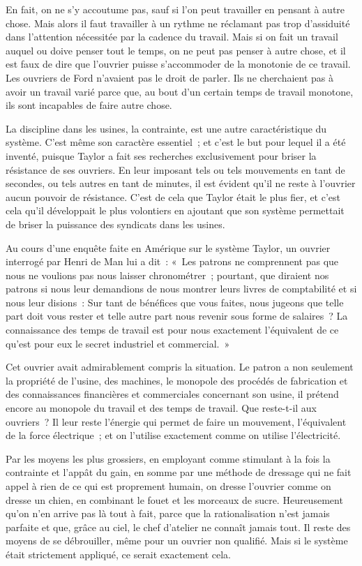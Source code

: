 \documentclass[french,twoside]{book} %
\begin{document}
En fait, on ne s'y accoutume pas, sauf si l'on peut travailler en pensant à autre chose. Mais alors il faut travailler à un rythme ne réclamant pas trop d'assiduité dans l'attention nécessitée par la cadence du travail. Mais si on fait un travail auquel ou doive penser tout le temps, on ne peut pas penser à autre chose, et il est faux de dire que l'ouvrier puisse s'accommoder de la monotonie de ce travail. Les ouvriers de Ford n'avaient pas le droit de parler. Ils ne cherchaient pas à avoir un travail varié parce que, au bout d'un certain temps de travail monotone, ils sont incapables de faire autre chose.\par
La discipline dans les usines, la contrainte, est une autre caractéristique du système. C'est même son caractère essentiel ; et c'est le but pour lequel il a été inventé, puisque Taylor a fait ses recherches exclusivement pour briser la résistance de ses ouvriers. En leur imposant tels ou tels mouvements en tant de secondes, ou tels autres en tant de minutes, il est évident qu'il ne reste à l'ouvrier aucun pouvoir de résistance. C'est de cela que Taylor était le plus fier, et c'est cela qu'il développait le plus volontiers en ajoutant que son système permettait de briser la puissance des syndicats dans les usines.\par
Au cours d'une enquête faite en Amérique sur le système Taylor, un ouvrier interrogé par Henri de Man lui a dit : « Les patrons ne comprennent pas que nous ne voulions pas nous laisser chronométrer ; pourtant, que diraient nos patrons si nous leur demandions de nous montrer leurs livres de comptabilité et si nous leur disions : Sur tant de bénéfices que vous faites, nous jugeons que telle part doit vous rester et telle autre part nous revenir sous forme de salaires ? La connaissance des temps de travail est pour nous exactement l'équivalent de ce qu'est pour eux le secret industriel et commercial. »\par
Cet ouvrier avait admirablement compris la situation. Le patron a non seulement la propriété de l'usine, des machines, le monopole des procédés de fabrication et des connaissances financières et commerciales concernant son usine, il prétend encore au monopole du travail et des temps de travail. Que reste-t-il aux ouvriers ? Il leur reste l'énergie qui permet de faire un mouvement, l'équivalent de la force électrique ; et on l'utilise exactement comme on utilise l'électricité.\par
Par les moyens les plus grossiers, en employant comme stimulant à la fois la contrainte et l'appât du gain, en somme par une méthode de dressage qui ne fait appel à rien de ce qui est proprement humain, on dresse l'ouvrier comme on dresse un chien, en combinant le fouet et les morceaux de sucre. Heureusement qu'on n'en arrive pas là tout à fait, parce que la rationalisation n'est jamais parfaite et que, grâce au ciel, le chef d'atelier ne connaît jamais tout. Il reste des moyens de se débrouiller, même pour un ouvrier non qualifié. Mais si le système était strictement appliqué, ce serait exactement cela.\par
\end{document}
